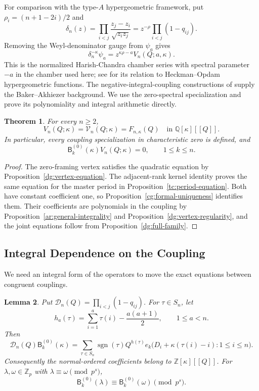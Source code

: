 \documentclass[11pt]{amsart}
\newtheorem{theorem}{Theorem}[section]
\newtheorem{lemma}[theorem]{Lemma}
\theoremstyle{definition}
\theoremstyle{remark}
\numberwithin{equation}{section}
\newcommand{\Z}{\mathbb Z}
\newcommand{\Q}{\mathbb Q}
\newcommand{\sgn}{\operatorname{sgn}}
\begin{document}
For comparison with the type-$A$ hypergeometric framework, put
$\rho_i=(n+1-2i)/2$ and
\[
 \delta_n(z)=\prod_{i<j}\frac{z_j-z_i}{\sqrt{z_iz_j}}
 =z^{-\rho}\prod_{i<j}(1-q_{ij}).
\]
Removing the Weyl-denominator gauge from $\psi_a$ gives
\[
 \delta_n^{-\kappa}\psi_a
 =z^{\kappa\rho-a}V_n(Q;a,\kappa).
\]
This is the normalized Harish-Chandra chamber series with spectral
parameter $-a$ in the chamber used here; see \cite{HR15} for its
relation to Heckman--Opdam hypergeometric functions. The
negative-integral-coupling constructions of \cite{FV09} supply the
Baker--Akhiezer background. We use the zero-spectral specialization
and prove its polynomiality and integral arithmetic directly.

\begin{theorem}\label{con:vertex}
For every $n\geq2$,
\[
 V_n(Q;\kappa)=\mathcal V_n(Q;\kappa)=F_{n,\kappa}(Q)
 \quad\text{in }\Q[\kappa][[Q]].
\]
In particular, every coupling specialization in characteristic
zero is defined, and
\[
 \mathsf B_k^{(0)}(\kappa)V_n(Q;\kappa)=0,\qquad 1\leq k\leq n.
\]
\end{theorem}

\begin{proof}
The zero-framing vertex satisfies the quadratic equation by
Proposition~\ref{dg:vertex-equation}. The adjacent-rank kernel
identity proves the same equation for the master period in
Proposition~\ref{tc:period-equation}. Both have constant
coefficient one, so Proposition~\ref{cg:formal-uniqueness}
identifies them. Their coefficients are polynomials in the
coupling by Proposition~\ref{ar:general-integrality} and
Proposition~\ref{dg:vertex-regularity}, and the joint equations
follow from Proposition~\ref{dg:full-family}.
\end{proof}

\subsection{Integral Dependence on the Coupling}
We need an integral form of the operators to move the exact
equations between congruent couplings.

\begin{lemma}\label{tc:integral-operators}
Put $\mathscr D_n(Q)=\prod_{i<j}(1-q_{ij})$. For $\tau\in S_n$,
let
\[
 h_a(\tau)=\sum_{i=1}^a\tau(i)-\frac{a(a+1)}2,
 \qquad 1\leq a<n.
\]
Then
\begin{equation}\label{tc:permutation-operator}
 \mathscr D_n(Q)\mathsf B_k^{(0)}(\kappa)
 =\sum_{\tau\in S_n}\sgn(\tau)Q^{h(\tau)}
 e_k\bigl(D_i+\kappa(\tau(i)-i):1\leq i\leq n\bigr).
\end{equation}
Consequently the normal-ordered coefficients belong to
$\Z[\kappa][[Q]]$. For $\lambda,\omega\in\Z_p$ with
$\lambda\equiv\omega\pmod{p^s}$,
\[
 \mathsf B_k^{(0)}(\lambda)
 \equiv\mathsf B_k^{(0)}(\omega)\pmod{p^s}.
\]
\end{lemma}
\end{document}
